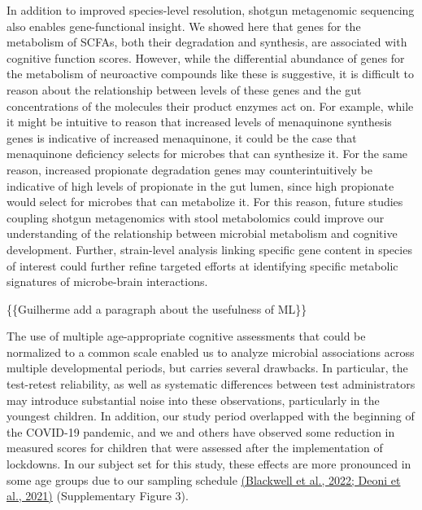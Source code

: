 \documentclass[
]{article}
\begin{document}
In addition to improved species-level resolution, shotgun metagenomic
sequencing also enables gene-functional insight. We showed here that
genes for the metabolism of SCFAs, both their degradation and synthesis,
are associated with cognitive function scores. However, while the
differential abundance of genes for the metabolism of neuroactive
compounds like these is suggestive, it is difficult to reason about the
relationship between levels of these genes and the gut concentrations of
the molecules their product enzymes act on. For example, while it might
be intuitive to reason that increased levels of menaquinone synthesis
genes is indicative of increased menaquinone, it could be the case that
menaquinone deficiency selects for microbes that can synthesize it. For
the same reason, increased propionate degradation genes may
counterintuitively be indicative of high levels of propionate in the gut
lumen, since high propionate would select for microbes that can
metabolize it. For this reason, future studies coupling shotgun
metagenomics with stool metabolomics could improve our understanding of
the relationship between microbial metabolism and cognitive development.
Further, strain-level analysis linking specific gene content in species
of interest could further refine targeted efforts at identifying
specific metabolic signatures of microbe-brain interactions.

\{\{Guilherme add a paragraph about the usefulness of ML\}\}

The use of multiple age-appropriate cognitive assessments that could be
normalized to a common scale enabled us to analyze microbial
associations across multiple developmental periods, but carries several
drawbacks. In particular, the test-retest reliability, as well as
systematic differences between test administrators may introduce
substantial noise into these observations, particularly in the youngest
children. In addition, our study period overlapped with the beginning of
the COVID-19 pandemic, and we and others have observed some reduction in
measured scores for children that were assessed after the implementation
of lockdowns. In our subject set for this study, these effects are more
pronounced in some age groups due to our sampling schedule
\href{https://www.zotero.org/google-docs/?L8GnRj}{(Blackwell et al.,
2022; Deoni et al., 2021)} (Supplementary Figure 3).
\end{document}
